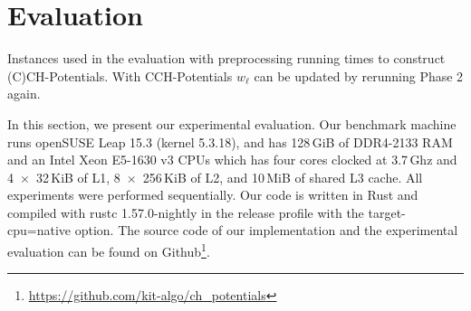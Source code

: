 \documentclass[manuscript,review]{acmart}
\begin{document}



\section{Evaluation}

\label{sec:experiments}

\begin{table}
\centering
\caption{Instances used in the evaluation with preprocessing running times to construct (C)CH-Potentials. With CCH-Potentials $w_{\ell}$ can be updated by rerunning Phase 2 again.}\label{tab:graphs}

\end{table}

In this section, we present our experimental evaluation.
Our benchmark machine runs openSUSE Leap 15.3 (kernel 5.3.18), and has 128\,GiB of DDR4-2133 RAM and an Intel Xeon E5-1630 v3 CPUs which has four cores clocked at 3.7\,Ghz and 4~$\times$~32\,KiB of L1, 8~$\times$~256\,KiB of L2, and 10\,MiB of shared L3 cache.
All experiments were performed sequentially.
Our code is written in Rust and compiled with rustc 1.57.0-nightly in the release profile with the target-cpu=native option.
The source code of our implementation and the experimental evaluation can be found on Github\footnote{\url{https://github.com/kit-algo/ch_potentials}}.
\end{document}
